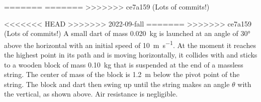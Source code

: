 \documentclass{../../oss-apphys-exam}
\newcounter{lastmc}
\begin{document}
  \begin{questions}    
=======
=======
>>>>>>> ce7a159 (Lots of commits!)
\begin{questions}
  \setcounter{question}{\value{lastmc}}
  
<<<<<<< HEAD
>>>>>>> 2022-09-fall
=======
>>>>>>> ce7a159 (Lots of commits!)
  \question A small dart of mass \SI{.020}{\kilo\gram} is launched at an angle
  of \ang{30} above the horizontal with an initial speed of
  \SI{10}{\meter\per\second}. At the moment it reaches the highest point in its
  path and is moving horizontally, it collides with and sticks to a wooden
  block of mass \SI{.10}{\kilo\gram} that is suspended at the end of a massless
  string. The center of mass of the block is \SI{1.2}{\metre} below the pivot
  point of the string. The block and dart then swing up until the string makes
  an angle $\theta$ with the vertical, as shown above. Air resistance is
  negligible.
\end{questions}
\end{questions}
\end{document}
